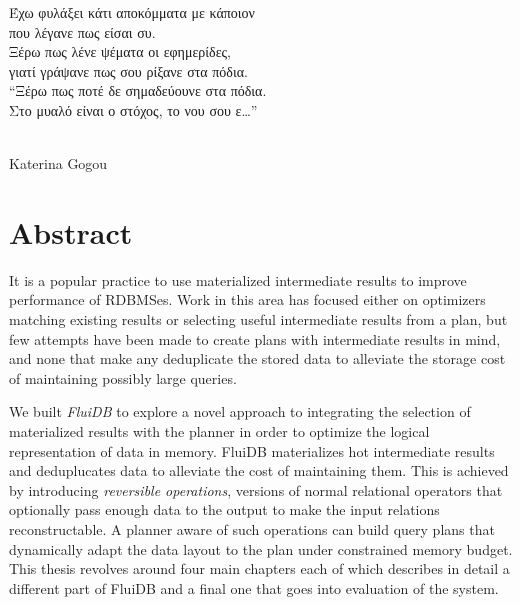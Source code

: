 \setcounter{page}{1}%

\maketitle%

\begin{precontent}
\begin{greek}%
\begin{normalsize}%
Έχω φυλάξει κάτι αποκόμματα με κάποιον\\%
που λέγανε πως είσαι συ.\\%
Ξέρω πως λένε ψέματα οι εφημερίδες,\\%
γιατί γράψανε πως σου ρίξανε στα πόδια.\\%
``Ξέρω πως ποτέ δε σημαδεύουνε στα πόδια.\\%
Στο μυαλό είναι ο στόχος, το νου σου ε…''\\%
\end{normalsize}%
\end{greek}\\[0.2cm]%
Katerina Gogou%


\chapter{Abstract}%
It is a popular practice to use materialized intermediate results to
improve performance of RDBMSes. Work in this area has focused either on
optimizers matching existing results or selecting useful intermediate
results from a plan, but few attempts have been made to create plans
with intermediate results in mind, and none that make any deduplicate
the stored data to alleviate the storage cost of maintaining possibly
large queries.

We built \emph{FluiDB} to explore a novel approach to integrating the
selection of materialized results with the planner in order to
optimize the logical representation of data in memory. FluiDB
materializes hot intermediate results and deduplucates data to
alleviate the cost of maintaining them. This is achieved by
introducing \emph{reversible operations}, versions of normal relational
operators that optionally pass enough data to the output to make the
input relations reconstructable. A planner aware of such operations
can build query plans that dynamically adapt the data layout to the
plan under constrained memory budget. This thesis revolves around four
main chapters each of which describes in detail a different part of
FluiDB and a final one that goes into evaluation of the system.


\end{precontent}
